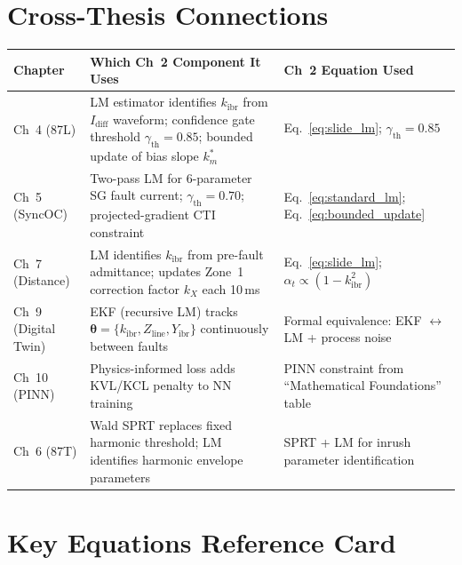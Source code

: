 \documentclass[12pt,a4paper]{article}
\newcommand{\kibr}{k_\mathrm{ibr}}
\newcommand{\gammath}{\gamma_\mathrm{th}}
\newcommand{\Idiff}{I_\mathrm{diff}}
\newcommand{\km}{k_m}
\begin{document}
\section{Cross-Thesis Connections}

\begin{center}
\small
\begin{tabularx}{\linewidth}{@{}lXX@{}}
\toprule
\textbf{Chapter} & \textbf{Which Ch~2 Component It Uses} & \textbf{Ch~2 Equation Used} \\
\midrule
Ch~4 (87L) &
  LM estimator identifies $\kibr$ from $\Idiff$ waveform; confidence gate
  threshold $\gammath = 0.85$; bounded update of bias slope $\km^*$ &
  Eq.~\eqref{eq:slide_lm}; $\gammath = 0.85$ \\
Ch~5 (SyncOC) &
  Two-pass LM for 6-parameter SG fault current; $\gammath = 0.70$;
  projected-gradient CTI constraint &
  Eq.~\eqref{eq:standard_lm}; Eq.~\eqref{eq:bounded_update} \\
Ch~7 (Distance) &
  LM identifies $\kibr$ from pre-fault admittance; updates Zone~1
  correction factor $k_X$ each 10\,ms &
  Eq.~\eqref{eq:slide_lm}; $\alpha_t \propto (1-\kibr^2)$ \\
Ch~9 (Digital Twin) &
  EKF (recursive LM) tracks $\bm{\theta} = \{\kibr, Z_\mathrm{line},
  Y_\mathrm{ibr}\}$ continuously between faults &
  Formal equivalence: EKF $\leftrightarrow$ LM + process noise \\
Ch~10 (PINN) &
  Physics-informed loss adds KVL/KCL penalty to NN training &
  PINN constraint from ``Mathematical Foundations'' table \\
Ch~6 (87T) &
  Wald SPRT replaces fixed harmonic threshold; LM identifies harmonic
  envelope parameters &
  SPRT + LM for inrush parameter identification \\
\bottomrule
\end{tabularx}
\end{center}

\section{Key Equations Reference Card}
\end{document}
